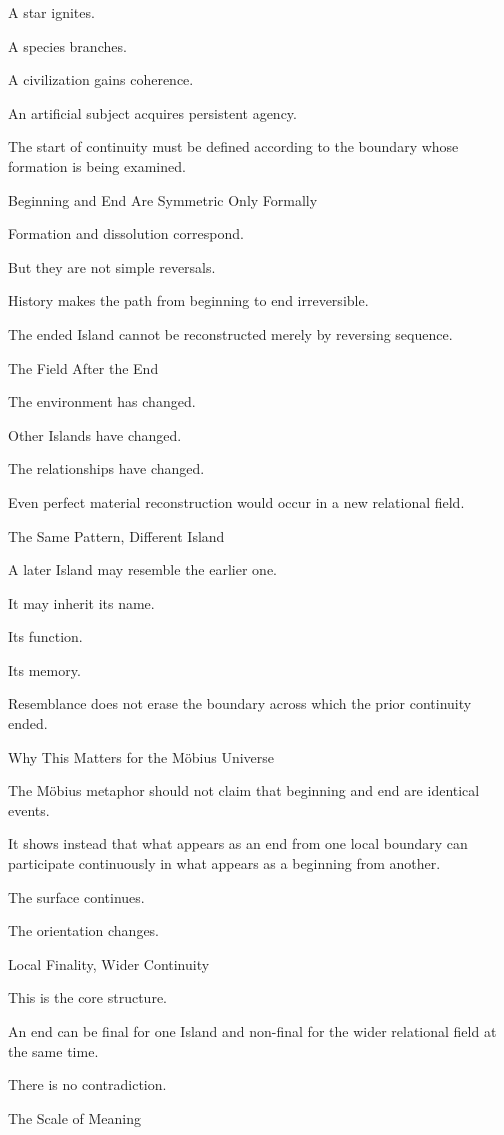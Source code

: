A star ignites.

A species branches.

A civilization gains coherence.

An artificial subject acquires persistent agency.

The start of continuity must be defined according to the boundary whose formation is being examined.

Beginning and End Are Symmetric Only Formally

Formation and dissolution correspond.

But they are not simple reversals.

History makes the path from beginning to end irreversible.

The ended Island cannot be reconstructed merely by reversing sequence.

The Field After the End

The environment has changed.

Other Islands have changed.

The relationships have changed.

Even perfect material reconstruction would occur in a new relational field.

The Same Pattern, Different Island

A later Island may resemble the earlier one.

It may inherit its name.

Its function.

Its memory.

Resemblance does not erase the boundary across which the prior continuity ended.

Why This Matters for the Möbius Universe

The Möbius metaphor should not claim that beginning and end are identical events.

It shows instead that what appears as an end from one local boundary can participate continuously in what appears as a beginning from another.

The surface continues.

The orientation changes.

Local Finality, Wider Continuity

This is the core structure.

An end can be final for one Island and non-final for the wider relational field at the same time.

There is no contradiction.

The Scale of Meaning

